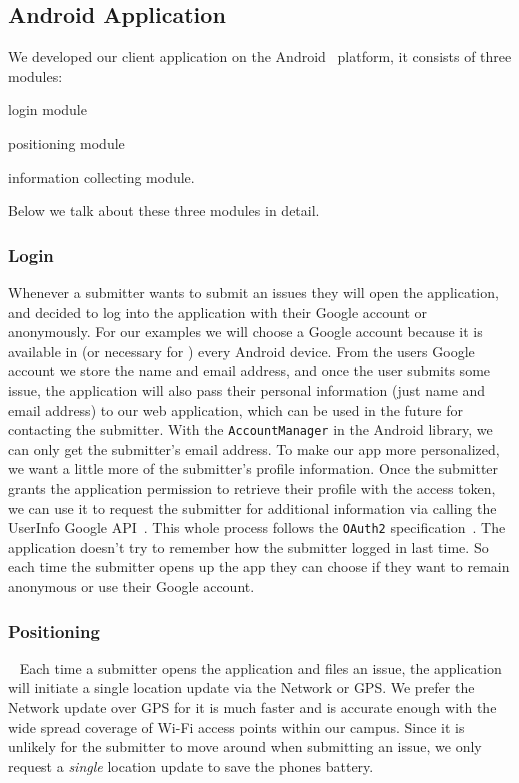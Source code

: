 \documentclass{acm_proc_article-sp}
\begin{document}
\subsection{Android Application}
We developed our client application on the Android~\cite{android} platform,
it consists of three modules:
\begin{inparaenum}
 \item login module
 \item positioning module
 \item information collecting module.
 \end{inparaenum}
 Below we talk about these three modules in detail.
 \subsubsection{Login}
 Whenever a submitter wants to submit an issues they will open the application, and decided to log into the application with their Google account or anonymously.
 For our examples we will choose a Google account because it is available in (or necessary for ) every Android device. From the users Google account we store the 
 name and email address, and once the user submits some issue, the application will also pass their personal information (just name and email address)
 to our web application, which can be used in the future for contacting the submitter. With the \texttt{AccountManager} in the Android library, we
 can only get the submitter's email address. To make our app more personalized, we want a little more of the submitter's profile information.
 Once the submitter grants the application permission to retrieve their profile with the access token,
 we can use it to request the submitter for additional information via calling the UserInfo Google API~\cite{google-user-api}.
 This whole process follows the \texttt{OAuth2} specification~\cite{oauth2}.
 The application doesn't try to remember how the submitter logged in last time.
 So each time the submitter opens up the app they can choose if they want to remain anonymous or use their Google account.

\subsubsection{Positioning}~\label{sec:position}
 Each time a submitter opens the application and files an issue, the application will initiate a single location update via the 
 Network or GPS. We prefer the Network update over GPS for it is much faster and is accurate enough with the wide spread coverage of Wi-Fi access points within our campus.
 Since it is unlikely for the submitter to move around when submitting an issue, we only request a \textit{single} location update 
 to save the phones battery.
 
\end{document}
